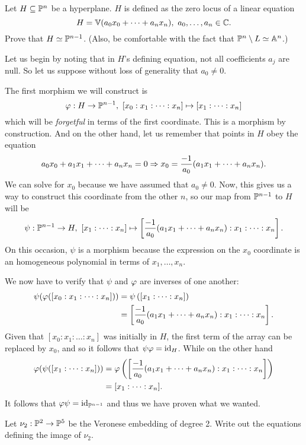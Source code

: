 \documentclass[12pt]{memoir}
\begin{document}
\begin{Ej}
 Let $H\subseteq\mathbb{P}^{n}$ be a hyperplane. $H$ is defined as the zero locus of a linear equation 
 $$H=\bV(a_0x_0+\dots+a_nx_n),\ a_0,\dots,a_n\in\bC.$$
 Prove that $H\simeq\mathbb{P}^{n-1}$. (Also, be comfortable with the fact that $\mathbb{P}^n\setminus L\simeq\mathbb{A}^n$.) 
\end{Ej}

\begin{ptcbr}
    Let us begin by noting that in $H$'s defining equation, not all coefficients $a_j$ are null. So let us suppose without loss of generality that $a_0\neq 0$.\par 
    The first morphism we will construct is 
    $$\vf:H\to\bP^{n-1},\ [x_0:x_1:\dots:x_n]\mapsto[x_1:\dots:x_n]$$
    which will be \emph{forgetful} in terms of the first coordinate. This is a morphism by construction. And on the other hand, let us remember that points in $H$ obey the equation
    $$a_0x_0+a_1x_1+\dots+a_nx_n=0\Rightarrow x_0=\frac{-1}{a_0}(a_1x_1+\dots+a_nx_n).$$
    We can solve for $x_0$ because we have assumed that $a_0\neq 0$. Now, this gives us a way to construct this coordinate from the other $n$, so our map from $\mathbb{P}^{n-1}$ to $H$ will be
    $$\psi:\bP^{n-1}\to H,\ [x_1:\dots:x_n]\mapsto \bonj{\frac{-1}{a_0}(a_1x_1+\dots+a_nx_n):x_1:\dots:x_n}.$$
    On this occasion, $\psi$ is a morphism because the expression on the $x_0$ coordinate is an homogeneous polynomial in terms of $x_1,\dots,x_n$.\par 
    We now have to verify that $\psi$ and $\varphi$ are inverses of one another:
    \begin{align*}
      \psi(\varphi([x_0:x_1:\dots:x_n]))&=\psi\left([x_1:\dots:x_n]\right)\\
      &=\left\lbrack\frac{-1}{a_0}(a_1x_1+\dots+a_nx_n):x_1:\dots:x_n\right\rbrack.
    \end{align*}
    Given that $[x_0:x_1:\dots:x_n]$ was initially in $H$, the first term of the array can be replaced by $x_0$, and so it follows that $\psi\varphi=\operatorname{id}_H$. While on the other hand
    \begin{align*}
      \varphi(\psi([x_1:\dots:x_n]))&=\varphi\left(\left\lbrack\frac{-1}{a_0}(a_1x_1+\dots+a_nx_n):x_1:\dots:x_n\right\rbrack\right)\\
      &=[x_1:\dots:x_n].
    \end{align*}
    It follows that $\varphi\psi=\operatorname{id}_{\mathbb{P}^{n-1}}$ and thus we have proven what we wanted.
  \end{ptcbr}

\begin{Ej}
  Let $\nu_2:\mathbb{P}^2\to\mathbb{P}^5$ be the Veronese embedding of degree 2. Write out the equations defining the image of $\nu_2$.
\end{Ej}
\end{document}
